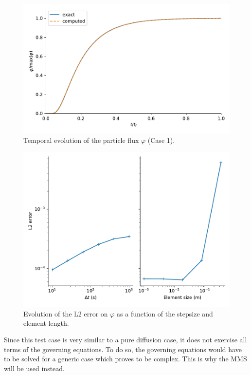 \begin{figure}
    \centering
    \includegraphics[width=\linewidth]{Figures/Chapter3/mes_festim_effective_diffusion.pdf}
    \caption{Temporal evolution of the particle flux $\varphi$ (Case 1).}
    \label{fig:FESTIM vs analytical}
\end{figure}

\begin{figure}
    \centering
    \includegraphics[width=\linewidth]{Figures/Chapter2/error_vs_element_size_and_dt.pdf}
    \caption{Evolution of the L2 error on $\varphi$ as a function of the stepsize and element length.}
\end{figure}
Since this test case is very similar to a pure diffusion case, it does not exercise all terms of the governing equations.
To do so, the governing equations would have to be solved for a generic case which proves to be complex.
This is why the MMS will be used instead.

